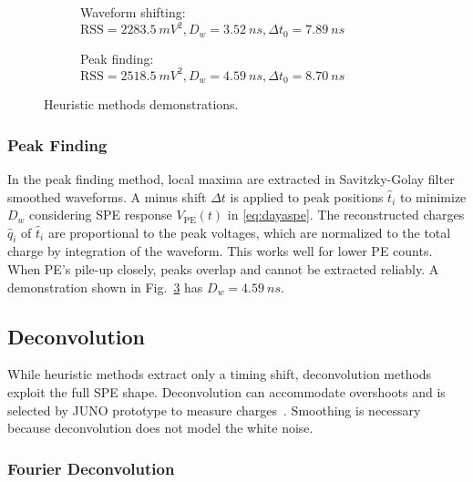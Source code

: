 \begin{figure}[H]
  \begin{subfigure}{0.5\textwidth}
    \centering
    \scalebox{0.36}{}
    \caption{\label{fig:shifting}Waveform shifting: $\mathrm{RSS}=\SI{2283.5}{mV^2},D_w=\SI{3.52}{ns},\Delta t_0=\SI{7.89}{ns}$}
  \end{subfigure}
  \begin{subfigure}{0.5\textwidth}
    \centering
    \scalebox{0.36}{}
    \caption{\label{fig:peak}Peak finding: $\mathrm{RSS}=\SI{2518.5}{mV^2},D_w=\SI{4.59}{ns},\Delta t_0=\SI{8.70}{ns}$}
  \end{subfigure}
  \caption{Heuristic methods demonstrations.}
\end{figure}

\subsubsection{Peak Finding}
\label{sec:findpeak}

In the peak finding method, local maxima are extracted in Savitzky-Golay filter~\cite{savitzky_smoothing_1964} smoothed waveforms.  A minus shift $\Delta t$ is applied to peak positions $\hat{t}_i$ to minimize $D_w$ considering SPE response $V_\mathrm{PE}(t)$ in \eqref{eq:dayaspe}. The reconstructed charges $\hat{q}_i$ of $\hat{t}_i$ are proportional to the peak voltages, which are normalized to the total charge by integration of the waveform.  This works well for lower PE counts. When PE's pile-up closely, peaks overlap and cannot be extracted reliably. A demonstration shown in Fig.~\ref{fig:peak} has $D_w = \SI{4.59}{ns}$. 

\subsection{Deconvolution}
While heuristic methods extract only a timing shift, deconvolution methods exploit the full SPE shape.  Deconvolution can accommodate overshoots and is selected by JUNO prototype to measure charges~\cite{zhang_comparison_2019}.  Smoothing is necessary because deconvolution does not model the white noise. 

\subsubsection{Fourier Deconvolution}

